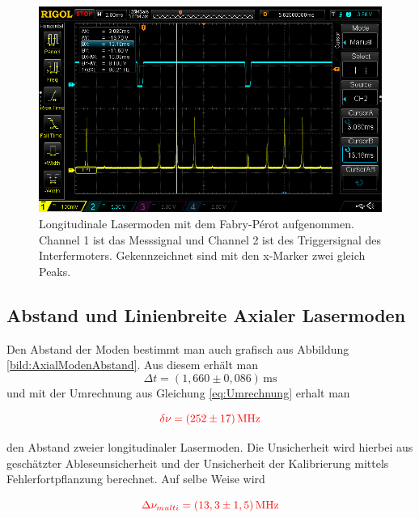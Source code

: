 \begin{figure}[ht]
    \centering
    \includegraphics[width = \linewidth]{Bilder/Auswertung/FabryPerotKalibr.png}
    \caption{Longitudinale Lasermoden mit dem Fabry-Pérot aufgenommen. Channel 1 ist das Messsignal und Channel 2 ist des Triggersignal des Interfermoters. Gekennzeichnet sind 
    mit den x-Marker zwei gleich Peaks.}
    \label{bild:FreierSpektralbereich}
\end{figure}


\subsection*{Abstand und Linienbreite Axialer Lasermoden}

Den Abstand der Moden bestimmt man auch grafisch aus Abbildung \ref{bild:AxialModenAbstand}. Aus diesem erhält man 
\begin{equation*}
    \Delta t = (1,660 \pm 0,086)\,\mathrm{ms}
\end{equation*}
und mit der Umrechnung aus Gleichung \ref{eq:Umrechnung} erhalt man 

\begin{equation}
    \textcolor{red}{\delta \nu = (252 \pm 17)\,\mathrm{MHz}}
    \label{eq:Modenabstand}
\end{equation}

den Abstand zweier longitudinaler Lasermoden. Die Unsicherheit wird hierbei aus geschätzter Ableseunsicherheit und
der Unsicherheit der Kalibrierung  mittels Fehlerfortpflanzung berechnet. Auf selbe Weise wird 

\begin{equation}
    \textcolor{red}{\Delta \nu_{multi} = (13,3 \pm 1,5)\,\mathrm{MHz}}
\end{equation}

